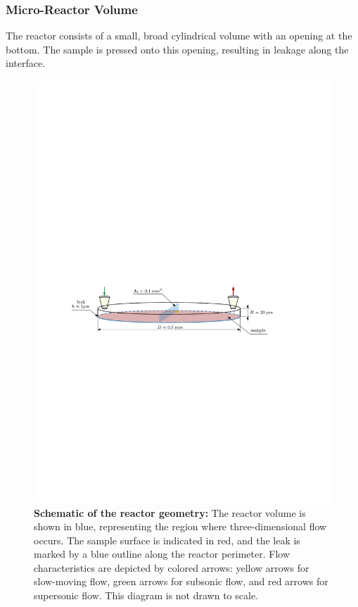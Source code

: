 \subsubsection*{Micro-Reactor Volume}
	The reactor consists of a small, broad cylindrical volume with an opening at the bottom.
	The sample is pressed onto this opening, resulting in leakage along the interface.
	\begin{figure}[H]
	    \centering
	    \includegraphics[width=\textwidth]{src/03_analytical-work/fig_reactor-geometry.pdf}
	    \caption[Schematic of the reactor geometry.]{
	        \textbf{Schematic of the reactor geometry:}
	        The reactor volume is shown in blue, representing the region where three-dimensional flow occurs.
	        The sample surface is indicated in red, and the leak is marked by a blue outline along the reactor perimeter.
	        Flow characteristics are depicted by colored arrows: yellow arrows for slow-moving flow, green arrows for subsonic flow, and red arrows for supersonic flow.
	        This diagram is not drawn to scale.
	    }
	    \label{fig:geometry-reactor}
	\end{figure}

